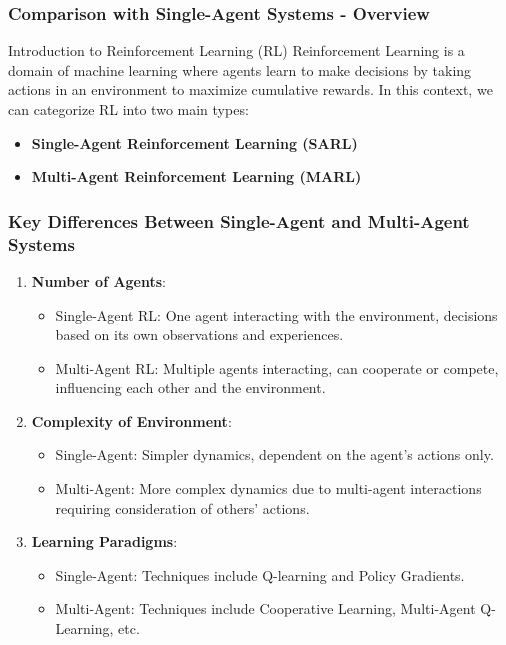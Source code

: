 \documentclass[aspectratio=169]{beamer}
\begin{document}
\begin{frame}[fragile]
    \frametitle{Comparison with Single-Agent Systems - Overview}
    \begin{block}{Introduction to Reinforcement Learning (RL)}
        Reinforcement Learning is a domain of machine learning where agents learn to make decisions by taking actions in an environment to maximize cumulative rewards. 
        In this context, we can categorize RL into two main types:
        \begin{itemize}
            \item \textbf{Single-Agent Reinforcement Learning (SARL)}
            \item \textbf{Multi-Agent Reinforcement Learning (MARL)}
        \end{itemize}
    \end{block}
\end{frame}

\begin{frame}[fragile]
    \frametitle{Key Differences Between Single-Agent and Multi-Agent Systems}
    \begin{enumerate}
        \item \textbf{Number of Agents}:
            \begin{itemize}
                \item Single-Agent RL: One agent interacting with the environment, decisions based on its own observations and experiences.
                \item Multi-Agent RL: Multiple agents interacting, can cooperate or compete, influencing each other and the environment.
            \end{itemize}
        \item \textbf{Complexity of Environment}:
            \begin{itemize}
                \item Single-Agent: Simpler dynamics, dependent on the agent's actions only.
                \item Multi-Agent: More complex dynamics due to multi-agent interactions requiring consideration of others' actions.
            \end{itemize}
        \item \textbf{Learning Paradigms}:
            \begin{itemize}
                \item Single-Agent: Techniques include Q-learning and Policy Gradients.
                \item Multi-Agent: Techniques include Cooperative Learning, Multi-Agent Q-Learning, etc.
            \end{itemize}
    \end{enumerate}
\end{frame}
\end{document}
